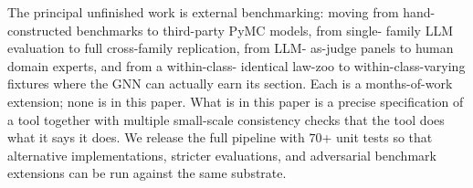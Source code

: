 \documentclass{article}
\begin{document}
The principal unfinished work is external benchmarking: moving from
hand-constructed benchmarks to third-party PyMC models, from single-
family LLM evaluation to full cross-family replication, from LLM-
as-judge panels to human domain experts, and from a within-class-
identical law-zoo to within-class-varying fixtures where the GNN
can actually earn its section. Each is a months-of-work extension;
none is in this paper. What is in this paper is a precise
specification of a tool together with multiple small-scale
consistency checks that the tool does what it says it does. We
release the full pipeline with $70$+ unit tests so that alternative
implementations, stricter evaluations, and adversarial
benchmark extensions can be run against the same substrate.



\end{document}
